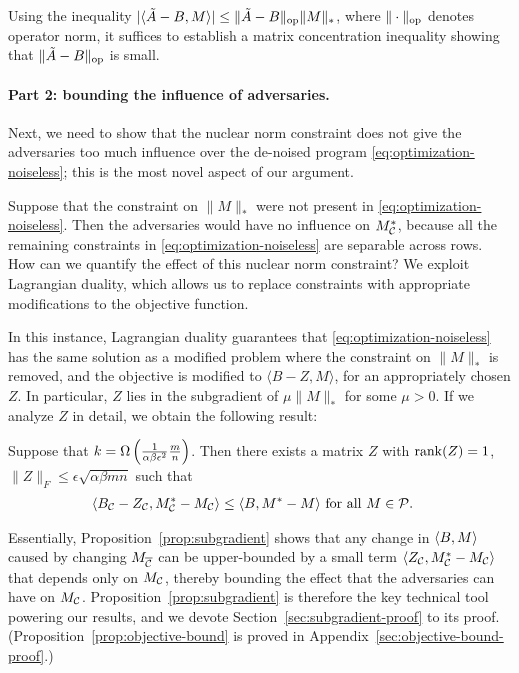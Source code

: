 Using the inequality $|\langle \tilde{A} - B, M \rangle| \leq \|\tilde{A}-B\|_{\mathrm{op}}\|M\|_*$, 
where $\|\cdot\|_{\mathrm{op}}$ denotes operator norm, it suffices to establish a matrix 
concentration inequality showing that $\|\tilde{A} - B\|_{\mathrm{op}}$ is small. 

\paragraph{Part 2: bounding the influence of adversaries.} 
Next, we need to show that the nuclear norm constraint does 
not give the adversaries too much influence over the de-noised program 
\eqref{eq:optimization-noiseless}; this is the most novel aspect 
of our argument.

Suppose that the constraint on $\|M\|_*$ were not present in 
\eqref{eq:optimization-noiseless}. Then the adversaries would have 
no influence on $M^*_{\mathcal{C}}$, because all the remaining constraints 
in \eqref{eq:optimization-noiseless} are separable across rows. 
How can we quantify the effect of this nuclear norm constraint?
We exploit Lagrangian duality, which allows us to replace constraints 
with appropriate modifications to the objective function.



In this instance, 
Lagrangian duality guarantees that \eqref{eq:optimization-noiseless} has the 
same solution as a modified problem where the constraint on $\|M\|_*$ is removed, 
and the objective is modified to $\langle B - Z, M \rangle$, for an appropriately 
chosen $Z$. In particular, $Z$ lies in the subgradient of 
$\mu \|M\|_*$ for some $\mu > 0$.
If we analyze $Z$ in detail, we obtain the following result:
\begin{proposition}
\label{prop:subgradient}
Suppose that $k = \Omega\left( \frac{1}{\alpha\beta\epsilon^2}\frac{m}{n} \right)$. 
Then there exists a matrix $Z$ with 
$\operatorname{rank}(Z) = 1$, $\|Z\|_F \leq \epsilon \sqrt{\alpha\beta mn}$ such that
\begin{align}
\langle B_{\mathcal{C}} - Z_{\mathcal{C}}, M^*_{\mathcal{C}} - M_{\mathcal{C}} \rangle &\leq \langle B, M^* - M \rangle \text{ for all $M \in \mathcal{P}$}.
\end{align}
\end{proposition}
Essentially, Proposition~\ref{prop:subgradient} shows that any change in 
$\langle B, M \rangle$ caused by changing $M_{\overline{\mathcal{C}}}$ can be upper-bounded 
by a small term $\langle Z_{\mathcal{C}}, M^*_{\mathcal{C}} - M_{\mathcal{C}} \rangle$ that depends only 
on $M_{\mathcal{C}}$, thereby bounding the effect that the adversaries can have 
on $M_{\mathcal{C}}$. Proposition~\ref{prop:subgradient} is therefore the key 
technical tool powering our results, and we devote 
Section~\ref{sec:subgradient-proof} to its proof. (Proposition~\ref{prop:objective-bound} is proved in Appendix~\ref{sec:objective-bound-proof}.)

